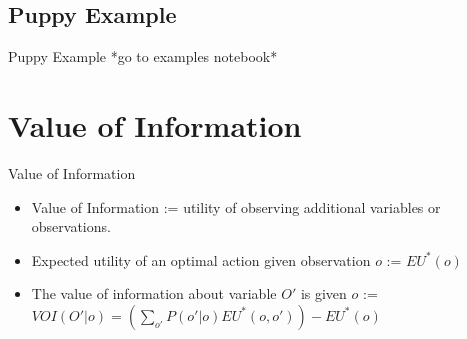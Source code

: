 \documentclass{beamer}
\begin{document}
\subsection{Puppy Example}
\begin{frame}{Puppy Example}
*go to examples notebook*
    
\end{frame}


\section{Value of Information}
\begin{frame}{Value of Information}
\begin{itemize}
    \item Value of Information := utility of observing additional variables or observations.
    \item Expected utility of an optimal action given observation $o$ := $EU^*(o)$
    \item The value of information about variable $O'$ is given $o$ :=
    $VOI(O'|o) = (\sum_{o'} P(o'|o)EU^*(o,o')) - EU^*(o)$ 
\end{itemize}
\end{frame}
\end{document}
